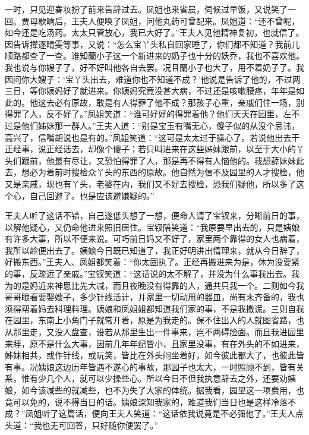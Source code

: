 \documentclass[12pt,oneside]{book}
\begin{document}
一时，只见迎春妆扮了前来告辞过去。凤姐也来省晨，伺候过早饭，又说笑了一回。贾母歇晌后，王夫人便唤了凤姐，问他丸药可曾配来。凤姐道：“还不曾呢，如今还是吃汤药。太太只管放心，我已大好了。”王夫人见他精神复初，也就信了。因告诉撵逐晴雯等事，又说：“怎么宝丫头私自回家睡了，你们都不知道？我前儿顺路都查了一查。谁知蘭小子这一个新进来的奶子也十分的妖乔，我也不喜欢他。我也说与你嫂子了，好不好叫他各自去罢。况且蘭小子也大了，用不着奶子了。我因问你大嫂子：‘宝丫头出去，难道你也不知道不成？’他说是告诉了他的，不过两三日，等你姨妈好了就进来。你姨妈究竟没甚大病，不过还是咳嗽腰疼，年年是如此的。他这去必有原故，敢是有人得罪了他不成？那孩子心重，亲戚们住一场，别得罪了人，反不好了。”凤姐笑道：“谁可好好的得罪着他？他们天天在园里，左不过是他们姊妹那一群人。”王夫人道：“别是宝玉有嘴无心，傻子似的从没个忌讳，高兴了，信嘴胡说也是有的。”凤姐笑道：“这可是太太过于操心了。若说他出去干正经事，说正经话去，却像个傻子；若只叫进来在这些姊妹跟前，以至于大小的丫头们跟前，他最有尽让，又恐怕得罪了人，那是再不得有人恼他的。我想薛妹妹此去，想必为着前时搜检众丫头的东西的原故。他自然为信不及园里的人才搜检，他又是亲戚，现也有丫头，老婆在内，我们又不好去搜检，恐我们疑他，所以多了这个心，自己回避了。也是应该避嫌疑的。”

王夫人听了这话不错，自己遂低头想了一想，便命人请了宝钗来，分晰前日的事，以解他疑心，又仍命他进来照旧居住。宝钗陪笑道：“我原要早出去的，只是姨娘有许多大事，所以不便来说。可巧前日妈又不好了，家里两个靠得的女人也病着，我所以趁便出去了。姨娘今日既已知道了，我正好明讲出情理来，就从今日辞了，好搬东西。”王夫人、凤姐都笑着：“你太固执了。正经再搬进来为是，休为没要紧的事，反疏远了亲戚。”宝钗笑道：“这话说的太不解了，并没为什么事我出去。我为的是妈近来神思比先大减，而且夜晚没有得靠的人，通共只我一个。二则如今我哥哥眼看要娶嫂子，多少针线活计，并家里一切动用的器皿，尚有未齐备的，我也须得帮着妈去料理料理。姨娘和凤姐姐都知道我们家的事，不是我撒谎。三则自我在园里，东南上小角门子就常开着，原是为我走的。保不住出入的人就图省路，也从那里走，又没人盘查，设若从那里生出一件事来，岂不两碍脸面。而且我进园里来睡，原不是什么大事，因前几年年纪皆小，且家里没事，有在外头的不如进来，姊妹相共，或作针线，或玩笑，皆比在外头闷坐着好，如今彼此都大了，也彼此皆有事。况姨娘这边历年皆遇不遂心的事故，那园子也太大，一时照顾不到，皆有关系，惟有少几个人，就可以少操些心。所以今日不但我执意辞去之外，还要劝姨娘，如今该减些的就减些，也不为失了大家的体统。据我看，园里这一项费用，也竟可以免的，说不得当日的话。姨娘深知我家的，难道我们当日也是这样冷落不成？”凤姐听了这篇话，便向王夫人笑道：“这话依我说竟是不必强他了。”王夫人点头道：“我也无可回答，只好随你便罢了。”
\end{document}
